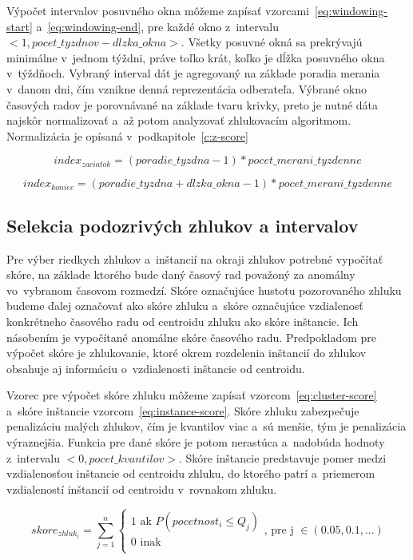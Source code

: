 \documentclass[a4paper,twoside,slovak,12pt,appendix]{article}
\begin{document}
Výpočet intervalov posuvného okna môžeme zapísať
vzorcami~\ref{eq:windowing-start} a~\ref{eq:windowing-end}, pre každé okno
z~intervalu $<1, pocet\_tyzdnov - dlzka\_okna>$. Všetky posuvné okná sa
prekrývajú minimálne v~jednom týždni, práve toľko krát, koľko je dĺžka posuvného
okna v~týždňoch. Vybraný interval dát je agregovaný na základe poradia merania
v~danom dni, čím vznikne denná reprezentácia odberateľa. Výbrané okno časových
radov je porovnávané na základe tvaru krivky, preto je nutné dáta najskôr
normalizovať a~až potom analyzovať zhlukovacím algoritmom. Normalizácia je
opísaná v~podkapitole~\ref{c:z-score}

\begin{equation}
  index_{zaciatok} = (poradie\_tyzdna - 1) * pocet\_merani\_tyzdenne
  \label{eq:windowing-start}
\end{equation}

\begin{equation}
  index_{koniec} = (poradie\_tyzdna + dlzka\_okna - 1) * pocet\_merani\_tyzdenne
  \label{eq:windowing-end}
\end{equation}

\subsection{Selekcia podozrivých zhlukov a intervalov}
Pre výber riedkych zhlukov a~inštancií na okraji zhlukov potrebné vypočítať
skóre, na základe ktorého bude daný časový rad považoný za anomálny vo~vybranom
časovom rozmedzí. Skóre označujúce hustotu pozorovaného zhluku budeme ďalej
označovať ako skóre zhluku a~skóre označujúce vzdialenosť konkrétneho časového
radu od centroidu zhluku ako skóre inštancie. Ich násobením je vypočítané
anomálne skóre časového radu. Predpokladom pre výpočet skóre je zhlukovanie,
ktoré okrem rozdelenia inštancií do zhlukov obsahuje aj informáciu
o~vzdialenosti inštancie od centroidu.

Vzorec pre výpočet skóre zhluku môžeme zapísať vzorcom~\ref{eq:cluster-score}
a~skóre inštancie vzorcom~\ref{eq:instance-score}. Skóre zhluku zabezpečuje
penalizáciu malých zhlukov, čím je kvantilov viac a~sú menšie, tým je
penalizácia výraznejšia. Funkcia pre dané skóre je potom nerastúca
a~nadobúda hodnoty z~intervalu $<0, pocet\_kvantilov>$. Skóre inštancie
predstavuje pomer medzi vzdialenosťou inštancie od centroidu zhluku, do ktorého
patrí a~priemerom vzdialeností inštancií od centroidu v~rovnakom zhluku.

\begin{equation}
  skore_{zhluk_i} = \sum_{j=1}^{n}
  \begin{cases}
    1 \text{ ak } P(pocetnost_i \leq Q_j) \\
    0 \text{ inak } \\
  \end{cases}
  \text{, pre j } \in (0.05, 0.1, ...)
  \label{eq:cluster-score}
\end{equation}
\end{document}
